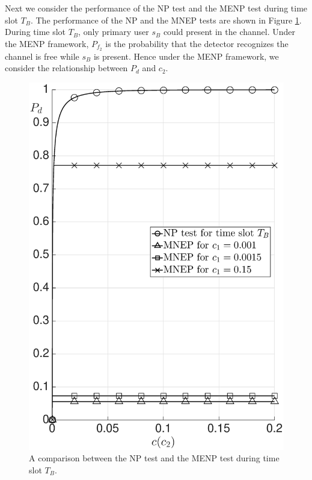 Next we consider the performance of the NP test and the MENP test during time slot $T_B$.
The performance of the NP and the MNEP tests are shown in Figure \ref{pic:20150704a0}. During time slot $T_B$, only primary user $s_B$ could present in the channel. Under the MENP framework, $P_{f_2}$ is the probability that the detector recognizes the channel is free while $s_B$ is present. Hence under the MENP framework, we consider the relationship between $P_d$ and $c_2$.

\begin{figure}[!hbp]
  \centering
  \includegraphics[width = 14cm]{5/SIb.eps}
  \caption{A comparison between the NP test and the MENP test during time slot $T_B$.} 
  \label{pic:20150704a0}
\end{figure} 

